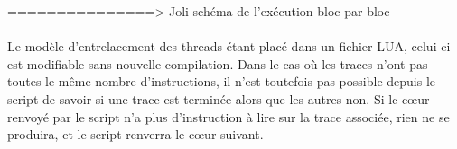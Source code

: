 ===============> Joli schéma de l'exécution bloc par bloc


\paragraph{}
Le modèle d'entrelacement des threads étant placé dans un fichier LUA, celui-ci est modifiable sans nouvelle compilation. Dans le cas où les traces n'ont pas toutes le même nombre d'instructions, il n'est toutefois pas possible depuis le script de savoir si une trace est terminée alors que les autres non. Si le c\oe ur renvoyé par le script n'a plus d'instruction à lire sur la trace associée, rien ne se produira, et le script renverra le c\oe ur suivant. 

